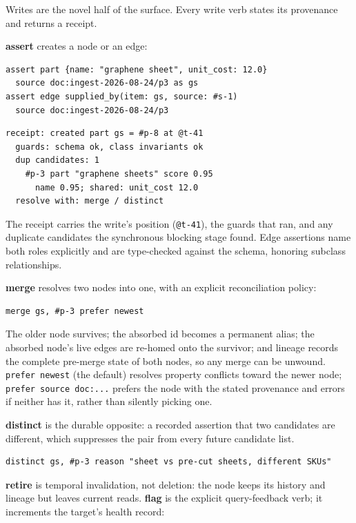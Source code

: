 \documentclass[11pt]{article}
\begin{document}
Writes are the novel half of the surface. Every write verb states its provenance and returns a receipt.

\textbf{assert} creates a node or an edge:

\begin{lstlisting}[style=gl]
assert part {name: "graphene sheet", unit_cost: 12.0}
  source doc:ingest-2026-08-24/p3 as gs
assert edge supplied_by(item: gs, source: #s-1)
  source doc:ingest-2026-08-24/p3
\end{lstlisting}
\begin{lstlisting}[style=res]
receipt: created part gs = #p-8 at @t-41
  guards: schema ok, class invariants ok
  dup candidates: 1
    #p-3 part "graphene sheets" score 0.95
      name 0.95; shared: unit_cost 12.0
  resolve with: merge / distinct
\end{lstlisting}

The receipt carries the write's position (\texttt{@t-41}), the guards that ran, and any duplicate candidates the synchronous blocking stage found. Edge assertions name both roles explicitly and are type-checked against the schema, honoring subclass relationships.

\textbf{merge} resolves two nodes into one, with an explicit reconciliation policy:

\begin{lstlisting}[style=gl]
merge gs, #p-3 prefer newest
\end{lstlisting}

The older node survives; the absorbed id becomes a permanent alias; the absorbed node's live edges are re-homed onto the survivor; and lineage records the complete pre-merge state of both nodes, so any merge can be unwound. \texttt{prefer newest} (the default) resolves property conflicts toward the newer node; \texttt{prefer source doc:...} prefers the node with the stated provenance and errors if neither has it, rather than silently picking one.

\textbf{distinct} is the durable opposite: a recorded assertion that two candidates are different, which suppresses the pair from every future candidate list.

\begin{lstlisting}[style=gl]
distinct gs, #p-3 reason "sheet vs pre-cut sheets, different SKUs"
\end{lstlisting}

\textbf{retire} is temporal invalidation, not deletion: the node keeps its history and lineage but leaves current reads. \textbf{flag} is the explicit query-feedback verb; it increments the target's health record:
\end{document}
